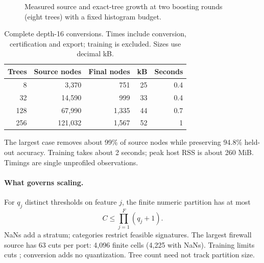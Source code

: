 \begin{figure}[t]
\centering
{}
\caption{Measured source and exact-tree growth at two boosting rounds (eight trees) with a fixed histogram budget.}
\label{fig:depth}
\end{figure}

\begin{table}[t]
\caption{Complete depth-16 conversions. Times include conversion, certification and export; training is excluded. Sizes use decimal kB.}
\label{tab:scaling}
\centering\small
\begin{tabular}{@{}rrrrr@{}}
\toprule
Trees & Source nodes & Final nodes & kB & Seconds\\
\midrule
8 & 3,370 & 751 & 25 & 0.4\\
32 & 14,590 & 999 & 33 & 0.4\\
128 & 67,990 & 1,335 & 44 & 0.7\\
256 & 121,032 & 1,567 & 52 & 1\\
\bottomrule
\end{tabular}
\end{table}
The largest case removes about 99\% of source nodes while preserving 94.8\% held-out accuracy. Training takes about 2 seconds; peak host RSS is about 260 MiB. Timings are single unprofiled observations.

\paragraph{What governs scaling.}
For $q_j$ distinct thresholds on feature $j$, the finite numeric partition has at most
\begin{equation}
  C\le\prod_{j=1}^{F}(q_j+1).
\end{equation}
NaNs add a stratum; categories restrict feasible signatures. The largest firewall source has 63 cuts per port: 4,096 finite cells (4,225 with NaNs). Training limits cuts \citep{xgbdocs}; conversion adds no quantization. Tree count need not track partition size.

